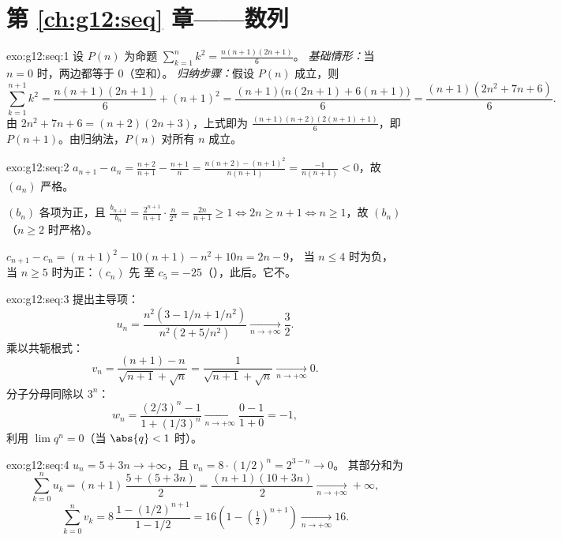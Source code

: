 \section*{第 \ref{ch:g12:seq} 章——数列}

\begin{solution}{exo:g12:seq:1}
设 $P(n)$ 为命题 $\sum_{k=1}^{n} k^2 = \frac{n(n+1)(2n+1)}{6}$。
\emph{基础情形：}当 $n = 0$ 时，两边都等于 $0$（空和）。
\emph{归纳步骤：}假设 $P(n)$ 成立，则
\[
\sum_{k=1}^{n+1} k^2 = \frac{n(n+1)(2n+1)}{6} + (n+1)^2
= \frac{(n+1)\bigl(n(2n+1) + 6(n+1)\bigr)}{6}
= \frac{(n+1)(2n^2 + 7n + 6)}{6}.
\]
由 $2n^2 + 7n + 6 = (n+2)(2n+3)$，上式即为
$\frac{(n+1)(n+2)(2(n+1)+1)}{6}$，即 $P(n+1)$。由归纳法，$P(n)$
对所有 $n$ 成立。
\end{solution}

\begin{solution}{exo:g12:seq:2}
$a_{n+1} - a_n = \frac{n+2}{n+1} - \frac{n+1}{n}
= \frac{n(n+2) - (n+1)^2}{n(n+1)} = \frac{-1}{n(n+1)} < 0$，故 $(a_n)$
严格。

$(b_n)$ 各项为正，且
$\frac{b_{n+1}}{b_n} = \frac{2^{n+1}}{n+1}\cdot\frac{n}{2^n} =
\frac{2n}{n+1} \geq 1 \iff 2n \geq n+1 \iff n \geq 1$，故 $(b_n)$
（$n \geq 2$ 时严格）。

$c_{n+1} - c_n = (n+1)^2 - 10(n+1) - n^2 + 10n = 2n - 9$，
当 $n \leq 4$ 时为负，当 $n \geq 5$ 时为正：$(c_n)$ 先
至 $c_5 = -25$（），此后。它不。
\end{solution}

\begin{solution}{exo:g12:seq:3}
提出主导项：
\[
u_n = \frac{n^2(3 - 1/n + 1/n^2)}{n^2(2 + 5/n^2)} \xrightarrow[n\to+\infty]{} \frac{3}{2}.
\]
乘以共轭根式：
\[
v_n = \frac{(n+1) - n}{\sqrt{n+1} + \sqrt{n}} = \frac{1}{\sqrt{n+1}+\sqrt{n}}
\xrightarrow[n\to+\infty]{} 0.
\]
分子分母同除以 $3^n$：
\[
w_n = \frac{(2/3)^n - 1}{1 + (1/3)^n} \xrightarrow[n\to+\infty]{} \frac{0-1}{1+0} = -1,
\]
利用 $\lim q^n = 0$（当 $\abs{q} < 1$ 时）。
\end{solution}

\begin{solution}{exo:g12:seq:4}
$u_n = 5 + 3n \to +\infty$，且 $v_n = 8 \cdot (1/2)^n = 2^{3-n} \to 0$。
其部分和为
\[
\sum_{k=0}^{n} u_k = (n+1)\,\frac{5 + (5+3n)}{2} = \frac{(n+1)(10+3n)}{2}
\xrightarrow[n\to+\infty]{} +\infty,
\]
\[
\sum_{k=0}^{n} v_k = 8\,\frac{1 - (1/2)^{n+1}}{1 - 1/2}
= 16\left(1 - \left(\tfrac{1}{2}\right)^{n+1}\right)
\xrightarrow[n\to+\infty]{} 16 .
\]
\end{solution}

